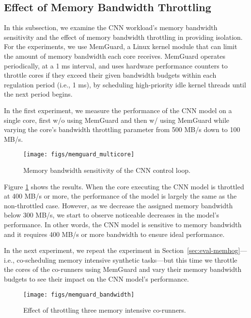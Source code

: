 \subsection{Effect of Memory Bandwidth Throttling}

In this subsection, we examine the CNN workload's memory bandwidth
sensitivity and the effect of memory bandwidth throttling in providing
isolation. For the experiments, we use MemGuard\cite{Yun2013}, a Linux
kernel module that can limit the amount of memory bandwidth each core
receives. MemGuard
operates periodically, at a 1 ms interval, and uses hardware
performance counters to throttle cores if they exceed their given
bandwidth budgets within each regulation period (i.e., 1 ms), by
scheduling high-priority idle kernel threads until the next period begins.


In the first experiment, we measure the performance of the CNN model
on a single core, first w/o using MemGuard and then w/
using MemGuard while varying the core's bandwidth throttling parameter
from 500 MB/s down to 100 MB/s.

\begin{figure}[h]
  \centering
  \texttt{[image: figs/memguard\_multicore]}
  \caption{Memory bandwidth sensitivity of the CNN control loop.}
  \label{fig:memguard_multicore}
\end{figure}

Figure \ref{fig:memguard_multicore} shows the results. When the core
executing the CNN model is throttled at 400 MB/s or more, the performance
of the model is largely the same as the non-throttled case. However, as
we decrease the assigned memory bandwidth below 300 MB/s, we start to
observe noticeable decreases in the model's performance. In other
words, the CNN model is sensitive to memory bandwidth and it
requires 400 MB/s or more bandwidth to ensure ideal performance.

In the next experiment, we repeat the experiment in
Section~\ref{sec:eval-memhog}---i.e., co-scheduling memory intensive
synthetic tasks---but this time we
throttle the cores of the co-runners using MemGuard and vary their
memory bandwidth budgets to see their impact on the CNN model's
performance.

\begin{figure}[h]
  \centering
  \texttt{[image: figs/memguard\_bandwidth]}
  \caption{Effect of throttling three memory intensive co-runners.}
  \label{fig:memguard_bandwidth}
\end{figure}

